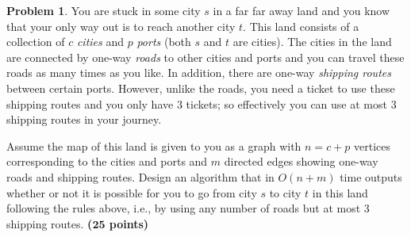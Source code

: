 \documentclass{article}
\theoremstyle{definition}
\newtheorem{problem}{Problem}
\newcommand{\grade}[1]{\hfill{\textbf{($\mathbf{#1}$ points)}}}
\begin{document}
\begin{problem}
	You are stuck in some city $s$ in a far far away land and you know that your only way out is to reach another city $t$. This land consists of a collection of $c$ \emph{cities} and $p$ \emph{ports} (both $s$ and $t$ are cities). The cities in the land are connected by one-way \emph{roads} to other cities and ports and you can travel these roads as many times as you like. In addition, there are one-way \emph{shipping routes} between certain ports. However, unlike the roads, you need a ticket to use these shipping routes and you only have $3$ tickets; so effectively you can use at most $3$ shipping routes in your journey. 
	
	Assume the map of this land is given to you as a graph with $n = c + p$ vertices corresponding to the cities and ports and $m$ directed edges showing one-way roads and shipping routes. Design an algorithm that in $O(n+m)$ time outputs whether  or not it is possible for you to go from city $s$ to city $t$ in this land following the rules above, i.e., by using any number of roads but at most $3$ shipping routes. \grade{25}
		
\end{problem}

\bigskip
\end{document}
